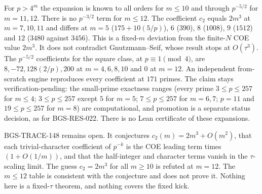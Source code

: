 \begin{theorem}[Exact expansions through $m=12$, BGS-TRACE-147, verification-pending]
\label{thm:linec-expansions}
For $p>4^m$ the expansion is known to all orders for $m\le 10$ and through $p^{-5/2}$ for $m=11,12$. There is no $p^{-3/2}$ term for $m\le 12$. The coefficient $c_2$ equals $2m^3$ at $m=7,10,11$ and differs at $m=5$ ($175+10(5/p)$), $6$ ($390$), $8$ ($1008$), $9$ ($1512$) and $12$ ($3480$ against $3456$). This is a fixed-$m$ deviation from the finite-$N$ COE value $2m^3$. It does not contradict Gnutzmann--Seif, whose result stops at $O(\tau^3)$. The $p^{-5/2}$ coefficients for the square class, at $p\equiv 1\pmod 4$, are $8,-72,128(2/p),200$ at $m=4,6,8,10$ and $0$ at $m=12$. An independent from-scratch engine reproduces every coefficient at $171$ primes. The claim stays verification-pending: the small-prime exactness ranges (every prime $3\le p\le257$ for $m\le4$; $3\le p\le257$ except $5$ for $m=5$; $7\le p\le257$ for $m=6,7$; $p=11$ and $19\le p\le257$ for $m=8$) are computational, and promotion is a separate status decision, as for BGS-RES-022. There is no Lean certificate of these expansions.
\end{theorem}

BGS-TRACE-148 remains open. It conjectures $c_2(m)=2m^3+O(m^2)$, that each trivial-character coefficient of $p^{-k}$ is the COE leading term times $(1+O(1/m))$, and that the half-integer and character terms vanish in the $\tau$-scaling limit. The guess $c_2=2m^3$ for all $m\ge 10$ is refuted at $m=12$. The $m\le 12$ table is consistent with the conjecture and does not prove it. Nothing here is a fixed-$\tau$ theorem, and nothing covers the fixed kick.
